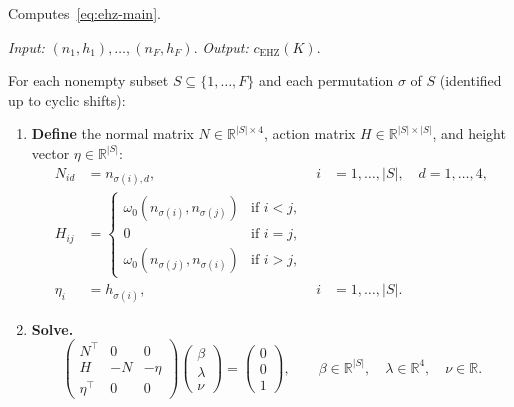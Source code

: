 \begin{algorithm}\label{alg:ehz}
Computes~\eqref{eq:ehz-main}.

\smallskip\noindent
\emph{Input:} $(n_1, h_1), \ldots, (n_F, h_F)$.
\quad
\emph{Output:} $c_{\mathrm{EHZ}}(K)$.

\smallskip\noindent
For each nonempty subset $S \subseteq \{1, \ldots, F\}$
and each permutation $\sigma$ of $S$
(identified up to cyclic shifts):

\begin{enumerate}
\item \textbf{Define}
  the normal matrix $N \in \mathbb{R}^{|S| \times 4}$,
  action matrix $H \in \mathbb{R}^{|S| \times |S|}$,
  and height vector $\eta \in \mathbb{R}^{|S|}$:
  \begin{align*}
    N_{id} &= n_{\sigma(i),d},
      & i &= 1, \ldots, |S|, \quad d = 1, \ldots, 4, \\
    H_{ij} &= \begin{cases}
      \omega_0(n_{\sigma(i)}, n_{\sigma(j)}) & \text{if } i < j, \\
      0 & \text{if } i = j, \\
      \omega_0(n_{\sigma(j)}, n_{\sigma(i)}) & \text{if } i > j,
    \end{cases} \\
    \eta_i &= h_{\sigma(i)},
      & i &= 1, \ldots, |S|.
  \end{align*}

\item \textbf{Solve.}
  \begin{equation}\label{eq:linear-system}
    \begin{pmatrix} N^\top & 0 & 0 \\ H & -N & -\eta \\ \eta^\top & 0 & 0 \end{pmatrix}
    \begin{pmatrix} \beta \\ \lambda \\ \nu \end{pmatrix}
    = \begin{pmatrix} 0 \\ 0 \\ 1 \end{pmatrix},
    \qquad
    \beta \in \mathbb{R}^{|S|}, \quad \lambda \in \mathbb{R}^4, \quad \nu \in \mathbb{R}.
  \end{equation}


\end{enumerate}
\end{algorithm}
